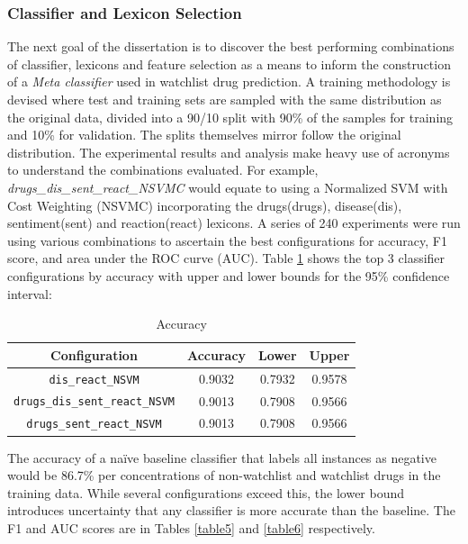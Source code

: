 \documentclass[twoside,11pt]{article}
\begin{document}
\subsubsection{Classifier and Lexicon Selection}
The next goal of the dissertation is to discover the best performing combinations of classifier, lexicons and feature selection as a means to inform the construction of a \textit{Meta classifier} used in watchlist drug prediction. A training methodology is devised where test and training sets are sampled with the same distribution as the original data, divided into a 90/10 split with 90\% of the samples for training and 10\% for validation. The splits themselves mirror follow the original distribution.
The experimental results and analysis make heavy use of acronyms to understand the combinations evaluated. For example, \textit{drugs\_dis\_sent\_react\_NSVMC} would equate to using a Normalized SVM with Cost Weighting (NSVMC) incorporating the drugs(drugs), disease(dis), sentiment(sent) and reaction(react) lexicons. A series of 240 experiments were run using various combinations to ascertain the best configurations for accuracy, F1 score, and area under the ROC curve (AUC). Table \ref{table4} shows the top 3 classifier configurations by accuracy with upper and lower bounds for the 95\% confidence interval:
\begin{table}[H]
  \centering
  \caption{Accuracy}
  \label{table4}
  \begin{tabular}{||c|c|c|c||}
    \hline
    Configuration & Accuracy & Lower & Upper \\
    \hline\hline
    \verb|dis_react_NSVM| & 0.9032 & 0.7932 & 0.9578 \\
    \hline
    \verb|drugs_dis_sent_react_NSVM| & 0.9013 & 0.7908 & 0.9566 \\
    \hline
    \verb|drugs_sent_react_NSVM| & 0.9013 & 0.7908 & 0.9566 \\
    \hline
  \end{tabular}
\end{table}
The accuracy of a na\"ive baseline classifier that labels all instances as negative would be 86.7\% per concentrations of non-watchlist and watchlist drugs in the training data. While several configurations exceed this, the lower bound introduces uncertainty that any classifier is more accurate than the baseline. The F1 and AUC scores are in Tables \ref{table5} and \ref{table6} respectively.
\end{document}
